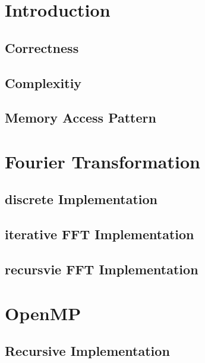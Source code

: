 \documentclass[12pt,a4paper,titlepage,oneside]{scrartcl}
\begin{document}
\maketitle
\setcounter{section}{0}
\setcounter{tocdepth}{2}
\tableofcontents
\pagebreak
%
%
\section{Introduction}
	\subsection{Correctness}
	
	\subsection{Complexitiy}
	
	\pagebreak
	\subsection{Memory Access Pattern}
	
\section{Fourier Transformation}
	\subsection{discrete Implementation}
	
	\subsection{iterative FFT Implementation}
	
	\subsection{recursvie FFT Implementation}
	
	
\section{OpenMP}
	\subsection{Recursive Implementation}
	
\end{document}
